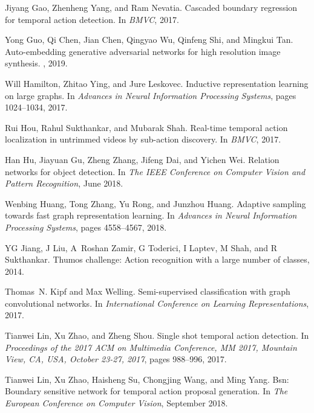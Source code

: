 \documentclass[10pt,twocolumn,letterpaper]{article}
\begin{document}
\begin{thebibliography}{10}
	Jiyang Gao, Zhenheng Yang, and Ram Nevatia.
	\newblock Cascaded boundary regression for temporal action detection.
	\newblock In {\em BMVC}, 2017.
	
	Yong Guo, Qi Chen, Jian Chen, Qingyao Wu, Qinfeng Shi, and Mingkui Tan.
	\newblock Auto-embedding generative adversarial networks for high resolution
	image synthesis.
	, 2019.
	
	Will Hamilton, Zhitao Ying, and Jure Leskovec.
	\newblock Inductive representation learning on large graphs.
	\newblock In {\em Advances in Neural Information Processing Systems}, pages
	1024--1034, 2017.
	
	Rui Hou, Rahul Sukthankar, and Mubarak Shah.
	\newblock Real-time temporal action localization in untrimmed videos by
	sub-action discovery.
	\newblock In {\em BMVC}, 2017.
	
	Han Hu, Jiayuan Gu, Zheng Zhang, Jifeng Dai, and Yichen Wei.
	\newblock Relation networks for object detection.
	\newblock In {\em The IEEE Conference on Computer Vision and Pattern
		Recognition}, June 2018.
	
	Wenbing Huang, Tong Zhang, Yu Rong, and Junzhou Huang.
	\newblock Adaptive sampling towards fast graph representation learning.
	\newblock In {\em Advances in Neural Information Processing Systems}, pages
	4558--4567, 2018.
	
	YG Jiang, J Liu, A~Roshan Zamir, G Toderici, I Laptev, M Shah, and R
	Sukthankar.
	\newblock Thumos challenge: Action recognition with a large number of classes,
	2014.
	
	Thomas~N. Kipf and Max Welling.
	\newblock Semi-supervised classification with graph convolutional networks.
	\newblock In {\em International Conference on Learning Representations}, 2017.
	
	Tianwei Lin, Xu Zhao, and Zheng Shou.
	\newblock Single shot temporal action detection.
	\newblock In {\em Proceedings of the 2017 {ACM} on Multimedia Conference, {MM}
		2017, Mountain View, CA, USA, October 23-27, 2017}, pages 988--996, 2017.
	
	Tianwei Lin, Xu Zhao, Haisheng Su, Chongjing Wang, and Ming Yang.
	\newblock Bsn: Boundary sensitive network for temporal action proposal
	generation.
	\newblock In {\em The European Conference on Computer Vision}, September 2018.
	

\end{thebibliography}
\end{document}
